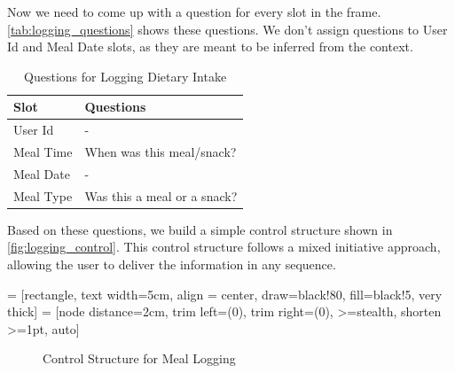 Now we need to come up with a question for every slot in the frame.
\autoref{tab:logging_questions} shows these questions.
We don't assign questions to User Id and Meal Date slots, as they are meant to be inferred from the context.

\begin{table}[htbp]
  \caption[Question for Logging Dietary Intake]{Questions for Logging Dietary Intake}\label{tab:logging_questions}
  \centering
  \begin{tabular}{l|l}
    Slot&Questions\\ \toprule
    User Id&-\\ \hline
    Meal Time&When was this meal/snack?\\ \hline
    Meal Date&-\\ \hline
    Meal Type&Was this a meal or a snack?\\ \hline
  \end{tabular}
\end{table}

Based on these questions, we build a simple control structure shown in \autoref{fig:logging_control}.
This control structure follows a mixed initiative approach, 
allowing the user to deliver the information in any sequence.

\usetikzlibrary{automata,positioning}
 = [rectangle,
                    text width=5cm,
                    align = center,
                    draw=black!80,
                    fill=black!5,
                    very thick]
 = [node distance=2cm,
                      trim left=(0),
                      trim right=(0),
                      >=stealth,
                      shorten >=1pt,
                      auto]
\begin{figure}[htbp]
  \centering
  \caption[Control Structure for Meal Logging]{Control Structure for Meal Logging}\label{fig:logging_control}
\end{figure}


